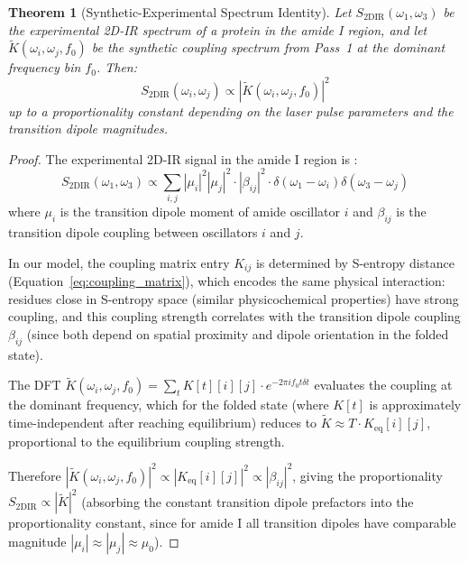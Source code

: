 \documentclass[11pt,twocolumn,a4paper]{article}
\newtheorem{theorem}{Theorem}[section]
\theoremstyle{definition}
\theoremstyle{remark}
\newcommand{\Ktilde}{\tilde{K}}
\newcommand{\natfreq}{\omega}
\begin{document}
\begin{theorem}[Synthetic-Experimental Spectrum Identity]
\label{thm:synthetic_experimental}
Let $S_{\text{2DIR}}(\natfreq_1, \natfreq_3)$ be the experimental 2D-IR spectrum of a protein in the amide I region, and let $\Ktilde(\natfreq_i, \natfreq_j, f_0)$ be the synthetic coupling spectrum from Pass~1 at the dominant frequency bin $f_0$. Then:
\begin{equation}
S_{\text{2DIR}}(\natfreq_i, \natfreq_j) \propto |\Ktilde(\natfreq_i, \natfreq_j, f_0)|^2
\end{equation}
up to a proportionality constant depending on the laser pulse parameters and the transition dipole magnitudes.
\end{theorem}

\begin{proof}
The experimental 2D-IR signal in the amide I region is \citep{hamm2011}:
\begin{equation}
S_{\text{2DIR}}(\natfreq_1, \natfreq_3) \propto \sum_{i,j} |\mu_i|^2 |\mu_j|^2 \cdot |\beta_{ij}|^2 \cdot \delta(\natfreq_1 - \natfreq_i) \delta(\natfreq_3 - \natfreq_j)
\end{equation}
where $\mu_i$ is the transition dipole moment of amide oscillator $i$ and $\beta_{ij}$ is the transition dipole coupling between oscillators $i$ and $j$.

In our model, the coupling matrix entry $K_{ij}$ is determined by S-entropy distance (Equation~\ref{eq:coupling_matrix}), which encodes the same physical interaction: residues close in S-entropy space (similar physicochemical properties) have strong coupling, and this coupling strength correlates with the transition dipole coupling $\beta_{ij}$ (since both depend on spatial proximity and dipole orientation in the folded state).

The DFT $\Ktilde(\natfreq_i, \natfreq_j, f_0) = \sum_t K[t][i][j] \cdot e^{-2\pi i f_0 t \delta t}$ evaluates the coupling at the dominant frequency, which for the folded state (where $K[t]$ is approximately time-independent after reaching equilibrium) reduces to $\Ktilde \approx T \cdot K_{\text{eq}}[i][j]$, proportional to the equilibrium coupling strength.

Therefore $|\Ktilde(\natfreq_i, \natfreq_j, f_0)|^2 \propto |K_{\text{eq}}[i][j]|^2 \propto |\beta_{ij}|^2$, giving the proportionality $S_{\text{2DIR}} \propto |\Ktilde|^2$ (absorbing the constant transition dipole prefactors into the proportionality constant, since for amide I all transition dipoles have comparable magnitude $|\mu_i| \approx |\mu_j| \approx \mu_0$).
\end{proof}
\end{document}
